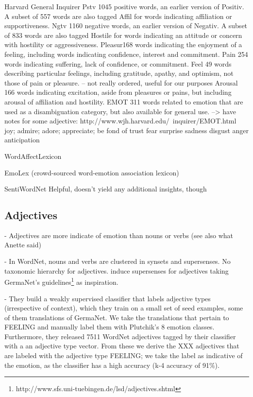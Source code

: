 Harvard General Inquirer
Pstv 1045 positive words, an earlier version of Positiv.
A subset of 557 words are also tagged Affil for words indicating affiliation or supportiveness.
Ngtv 1160 negative words, an earlier version of Negativ.
A subset of 833 words are also tagged Hostile for words indicating an attitude or concern with hostility or aggressiveness.
Pleasur168 words indicating the enjoyment of a feeling, including words indicating confidence, interest and commitment.
Pain 254 words indicating suffering, lack of confidence, or commitment.
Feel 49 words describing particular feelings, including gratitude, apathy, and optimism, not those of pain or pleasure.
-- not really ordered, useful for our purposes
Arousal 166 words indicating excitation, aside from pleasures or pains, but including arousal of affiliation and hostility.
EMOT 311 words related to emotion that are used as a disambiguation category, but also available for general use.
--> have notes for some adjective: http://www.wjh.harvard.edu/~inquirer/EMOT.html
joy; admire; adore; appreciate; be fond of
trust
fear
surprise
sadness
disgust
anger
anticipation

WordAffectLexicon



EmoLex (crowd-sourced word-emotion association lexicon)


SentiWordNet
Helpful, doesn't yield any additional insights, though


\subsection{Adjectives}

- Adjectives are more indicate of emotion than nouns or verbs (see also what Anette said)

- In WordNet, nouns and verbs are clustered in synsets and supersenses. No taxonomic hierarchy for adjectives. \cite{adjective_supersenses} induce supersenses for adjectives taking GermaNet's guidelines\footnote{http://www.sfs.uni-tuebingen.de/lsd/adjectives.shtml} as inspiration.

- They build a weakly supervised classifier that labels adjective types (irrespective of context), which they train on a small set of seed examples, some of them translations of GermaNet. We take the translations that pertain to FEELING and manually label them with Plutchik's 8 emotion classes. Furthermore, they released 7511 WordNet adjectives tagged by their classifier with a an adjective type vector. From these we derive the XXX adjectives that are labeled with the adjective type FEELING; we take the label as indicative of the emotion, as the classifier has a high accuracy (k-4 accuracy of 91\%).


